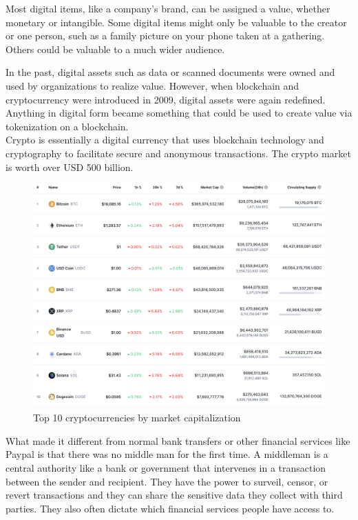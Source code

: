 \documentclass[MSE,Master,english]{twbook}%
\begin{document}
Most digital items, like a company's brand, can be assigned a value, whether monetary or intangible. Some digital items might only be valuable to the creator or one person, such as a family picture on your phone taken at a gathering. Others could be valuable to a much wider audience.

In the past, digital assets such as data or scanned documents were owned and used by organizations to realize value. However, when blockchain and cryptocurrency were introduced in 2009, digital assets were again redefined. Anything in digital form became something that could be used to create value via tokenization on a blockchain. \\

\ac{Crypto} is essentially a digital currency that uses blockchain technology and cryptography to facilitate secure and anonymous transactions. The crypto market is worth over USD 500 billion.\cite{crypto}

\begin{figure}[H]
  \centering
  \includegraphics[width=\textwidth]{crypto_ranking.png}
  \caption{Top 10 cryptocurrencies by market capitalization \cite{coinmarketcap}}
  \label{fig:ranking}
\end{figure}

What made it different from normal bank transfers or other financial services like Paypal is that there was no middle man for the first time. A middleman is a central authority like a bank or government that intervenes in a transaction between the sender and recipient. They have the power to surveil, censor, or revert transactions and they can share the sensitive data they collect with third parties. They also often dictate which financial services people have access to.\cite{ethereum} \\
\end{document}
